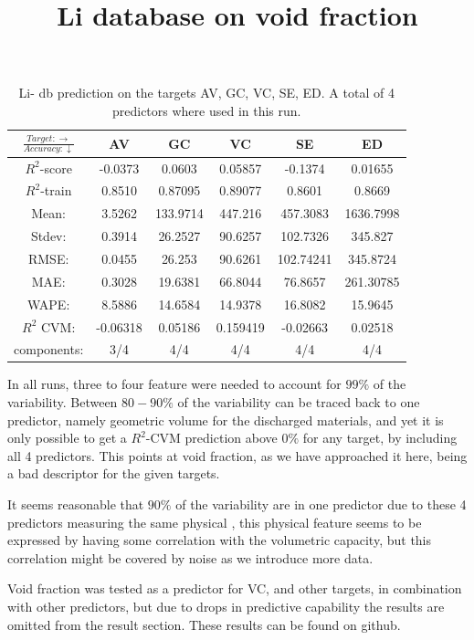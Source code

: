 \begin{table}[h]
\normalsize
\centering
\caption{Li- db prediction on the targets AV, GC, VC, SE, ED. A total of 4 predictors where used in this run.}
\title{Li database on void fraction}
\begin{tabular}{|c|c|c|c|c|c|}
	\hline 
	$\frac{Target: \rightarrow}{Accuracy:\downarrow} $ & AV & GC & VC & SE & ED 
	 \\ 
	\hline
	$R^2$-score 	& -0.0373 & 0.0603 & 0.05857 &  -0.1374 &  0.01655\\ 
	\hline 
	$R^2$-train 	&  0.8510 &  0.87095 & 0.89077 &  0.8601 & 0.8669 \\ 
	\hline
	Mean: 		 &3.5262&133.9714&447.216	&457.3083&1636.7998	\\
	\hline 
	Stdev:		 &0.3914	&26.2527	&90.6257&102.7326&345.827\\
	\hline 
	RMSE: 		&0.0455& 26.253 &  90.6261 & 102.74241 & 345.8724 \\ 
	\hline
	MAE: 		& 0.3028 & 19.6381& 66.8044 & 76.8657 & 261.30785 \\ 
	\hline
	WAPE: 		& 8.5886 & 14.6584 & 14.9378  & 16.8082 & 15.9645 \\
	\hline
	$R^2$ CVM: & -0.06318 & 0.05186 & 0.159419  & -0.02663 & 0.02518 \\
	\hline
	components: & 3/4 	& 4/4 & 4/4  & 4/4 & 4/4 \\
	\hline
\end{tabular}
\label{tab:Li-vf}
\end{table}


In all runs, three to four feature were needed to account for $99\%$ of the variability. Between $80-90\%$ of the variability can be traced back to one predictor, namely geometric volume for the discharged materials, and yet it is only possible to get a $R^2$-CVM prediction above $0\%$ for any target, by including all 4 predictors. This points at void fraction, as we have approached it here, being a bad descriptor for the given targets. 

It seems reasonable that $90\%$ of the variability are in one predictor due to these 4 predictors measuring the same physical , this physical feature seems to be expressed by having some correlation with the volumetric capacity, but this correlation might be covered by noise as we introduce more data.

Void fraction was tested as a predictor for VC, and other targets, in combination with other predictors, but due to drops in predictive capability the results are omitted from the result section. These results can be found on github.

